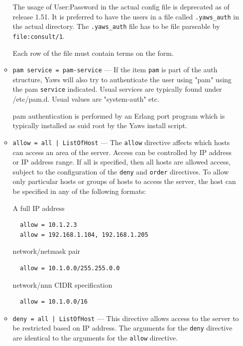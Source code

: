 \documentclass[11pt,oneside,english]{book}
\begin{document}
\begin{itemize}
\begin{itemize}
                The usage of User:Password in the actual config file is
                deprecated as of release 1.51. It is preferred to have the users
                in a file called \verb+.yaws_auth+ in the actual directory. The
                \verb+.yaws_auth+ file has to be file parseable by
                \verb+file:consult/1+.

                Each row of the file must contain terms on the form.

              \item \verb+pam service = pam-service+ --- If the item \verb+pam+
                is part of the auth structure, Yaws will also try to
                authenticate the user using "pam" using the pam \verb+service+
                indicated. Usual services are typically found under
                /etc/pam.d. Usual values are "system-auth" etc.

                pam authentication is performed by an Erlang port program which
                is typically installed as suid root by the Yaws install script.

              \item \verb+allow = all | ListOfHost+ --- The \verb+allow+
                directive affects which hosts can access an area of the
                server. Access can be controlled by IP address or IP address
                range. If all is specified, then all hosts are allowed access,
                subject to the configuration of the \verb+deny+ and \verb+order+
                directives. To allow only particular hosts or groups of hosts to
                access the server, the host can be specified in any of the
                following formats:

                A full IP address
\begin{verbatim}
  allow = 10.1.2.3
  allow = 192.168.1.104, 192.168.1.205
\end{verbatim}
                network/netmask pair
\begin{verbatim}
  allow = 10.1.0.0/255.255.0.0
\end{verbatim}
                network/nnn CIDR specification
\begin{verbatim}
  allow = 10.1.0.0/16
\end{verbatim}

              \item \verb+deny = all | ListOfHost+ --- This directive allows
                access to the server to be restricted based on IP address. The
                arguments for the \verb+deny+ directive are identical to the
                arguments for the \verb+allow+ directive.


\end{itemize}
\end{itemize}
\end{document}
